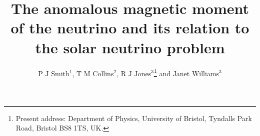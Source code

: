 \documentclass[12pt]{iopart}
\begin{document}
\title[The anomalous magnetic moment of the
neutrino]{The anomalous magnetic moment of the
neutrino and its relation to the solar neutrino problem}
\author{P J Smith$^1$, T M Collins$^2$,
R J Jones$^3$\footnote{Present address:
Department of Physics, University of Bristol, Tyndalls Park Road,
Bristol BS8 1TS, UK.} and Janet Williams$^3$}
\address{$^1$ Mathematics Faculty, Open University,
Milton Keynes MK7~6AA, UK}
\address{$^2$ Department of Mathematics,
Imperial College, Prince Consort Road, London SW7~2BZ, UK}
\address{$^3$ Department of Computer Science,
University College London, Gower Street, London WC1E~6BT, UK}
\submitto{\jpg}
\maketitle
\end{document}
